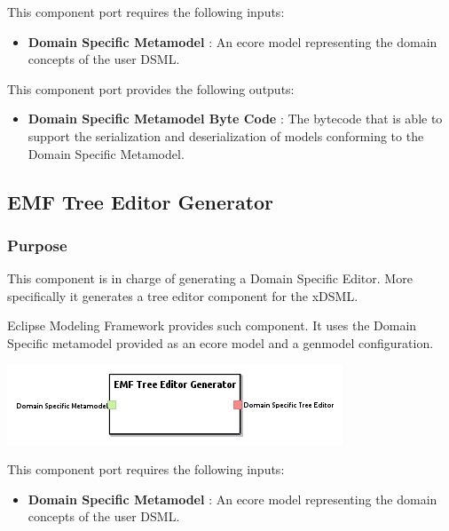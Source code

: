 \documentclass{gemoc} %
\begin{document}
This component port requires the following inputs:
\begin{itemize}
  \item \textbf{Domain Specific Metamodel} :
An ecore model representing the domain concepts of the user DSML.
\end{itemize}

This component port provides the following outputs:
\begin{itemize}
  \item \textbf{Domain Specific Metamodel Byte Code} :
The bytecode that is able to support the serialization and deserialization of models conforming to the Domain Specific Metamodel.
\end{itemize}


\subsection{EMF Tree Editor Generator}


\subsubsection{Purpose}
This component is in charge of generating a Domain Specific Editor. More specifically it generates a tree editor component for the xDSML. 

Eclipse Modeling Framework provides such component. It uses the Domain Specific metamodel provided as an ecore model and a genmodel configuration.

\begin{center}
\includegraphics*[trim=0.0cm 0.0cm 0cm 0.0cm, clip=true]{../images/generated/Generated_EMF_Tree_Editor_Generator.png}
\end{center}

This component port requires the following inputs:
\begin{itemize}
  \item \textbf{Domain Specific Metamodel} :
An ecore model representing the domain concepts of the user DSML.
\end{itemize}
\end{document}

